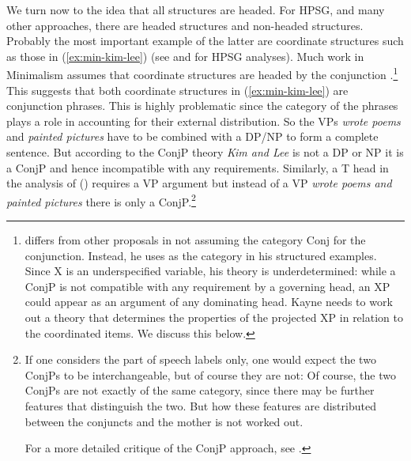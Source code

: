 \documentclass[output=paper
                ,modfonts
                ,nonflat
	        ,collection
	        ,collectionchapter
	        ,collectiontoclongg
 	        ,biblatex
                ,babelshorthands
                ,newtxmath
                ,draftmode
                ,colorlinks, citecolor=brown
]{./langsci/langscibook}
\begin{document}
We turn now to the idea that all structures are headed. For HPSG, and many other approaches, there
are headed structures and non-headed structures. Probably the most important example of the latter
are coordinate structures such as those in (\ref{ex:min-kim-lee}) (see \citealt{Sag2003a-u} and  for HPSG analyses).
\label{ex:min-kim-lee}
\z
Much work in Minimalism assumes that coordinate structures are headed by the conjunction
\parencites[]{Larson90a-u}[]{Radford93a-u}[Chapter~6]{Kayne94a-u}{Johannessen98a-u}[]{vanKoppen2005a-u}[]{Boskovic2009a-u}[]{Citko2011a-u}.\footnote{
  \citet[]{Kayne94a-u} differs from other proposals in not assuming the category Conj for
  the conjunction. Instead, he uses \xnull as the category in his structured examples. Since X is an
  underspecified variable, his theory is underdetermined: while a ConjP is not compatible with any
  requirement by a governing head, an XP could appear as an argument of any dominating head. Kayne
  needs to work out a theory that determines the properties of the projected XP in relation to
  the coordinated items. We discuss this below.
}
This suggests that both coordinate structures in (\ref{ex:min-kim-lee}) are conjunction phrases. This is
highly problematic since the category of the phrases plays a role in accounting for their external
distribution. So the VPs \emph{wrote poems} and \emph{painted pictures} have to be combined with a
DP/NP to form a complete sentence. But according to the ConjP theory \emph{Kim and Lee} is not a DP
or NP it is a ConjP and hence incompatible with any requirements. Similarly, a T head in the
analysis of () requires a VP argument but instead of a VP \emph{wrote poems and painted
  pictures} there is only a ConjP.\footnote{
If one considers the part of speech labels only, one would expect the two ConjPs to be interchangeable, but of course they are
not:
\label{ex:min-sang-dance}
\z
Of course, the two ConjPs are not exactly of the same category, since there may be further features that
distinguish the two. But how these features are distributed between the conjuncts and the
mother is not worked out.

For a more detailed critique of the ConjP approach, see \citet{Borsley2005a}.%
}
\end{document}
